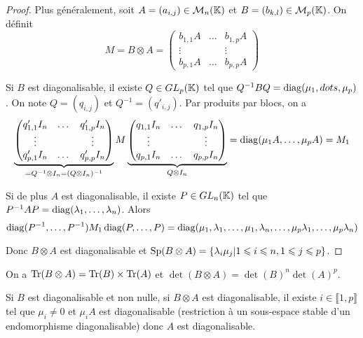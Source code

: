 \documentclass[12pt]{article}
\begin{document}
\begin{proof}
	Plus généralement, soit $A=(a_{i,j})\in\mathcal{M}_{n}(\mathbb{K})$ et $B=(b_{k,l})\in\mathcal{M}_{p}(\mathbb{K})$. On définit 
	\begin{equation}
		M=B\otimes A=
		\begin{pmatrix}
			b_{1,1}A&\dots&b_{1,p}A\\
			\vdots&&\vdots\\
			b_{p,1}A&\dots&b_{p,p}A
		\end{pmatrix}
	\end{equation}

	Si $B$ est diagonalisable, il existe $Q\in GL_{p}(\mathbb{K})$ tel que $Q^{-1}BQ=\operatorname{diag}(\mu_{1},dots,\mu_{p})$. On note $Q=(q_{i,j})$ et $Q^{-1}=(q'_{i,j})$. Par produits par blocs, on a 
	\begin{equation}
		\underbrace{\begin{pmatrix}
			q'_{1,1}I_{n}&\dots&q'_{1,p}I_{n}\\
			\vdots&&\vdots\\
			q'_{p,1}I_{n}&\dots&q'_{p,p}I_{n}
		\end{pmatrix}}_{=Q^{-1}\otimes I_{n}=(Q\otimes I_{n})^{-1}}M
		\underbrace{\begin{pmatrix}
			q_{1,1}I_{n}&\dots&q_{1,p}I_{n}\\
			\vdots&&\vdots\\
			q_{p,1}I_{n}&\dots&q_{p,p}I_{n}
		\end{pmatrix}}_{Q\otimes I_{n}}
		=\operatorname{diag}(\mu_{1}A,\dots,\mu_{p}A)=M_{1}
	\end{equation}

	Si de plus $A$ est diagonalisable, il existe $P\in GL_{n}(\mathbb{K})$ tel que $P^{-1}AP=\operatorname{diag}(\lambda_{1},\dots,\lambda_{n})$. Alors 
	\begin{equation}
		\operatorname{diag}(P^{-1},\dots,P^{-1})M_{1}\operatorname{diag}(P,\dots,P)=\operatorname{diag}(\mu_{1},\lambda_{1},\dots,\mu_{1},\lambda_{n},\dots,\mu_{p}\lambda_{1},\dots,\mu_{p}\lambda_{n})
	\end{equation}

	Donc $B\otimes A$ est diagonalisable et $\operatorname{Sp}(B\otimes A)=\left\lbrace \lambda_{i}\mu_{j}\middle| 1\leqslant i\leqslant n,1\leqslant j\leqslant p\right\rbrace$.
\end{proof}

\begin{remark}
	On a $\operatorname{Tr}(B\otimes A)=\operatorname{Tr}(B)\times\operatorname{Tr}(A)$ et $\det(B\otimes A)=\det(B)^{n}\det(A)^{p}$.
\end{remark}
\begin{remark}
	Si $B$ est diagonalisable et non nulle, si $B\otimes A$ est diagonalisable, il existe $i\in\llbracket1,p\rrbracket$ tel que $\mu_{i}\neq0$ et $\mu_{i}A$ est diagonalisable (restriction à un sous-espace stable d'un endomorphisme diagonalisable) donc $A$ est diagonalisable.
\end{remark}
\end{document}
